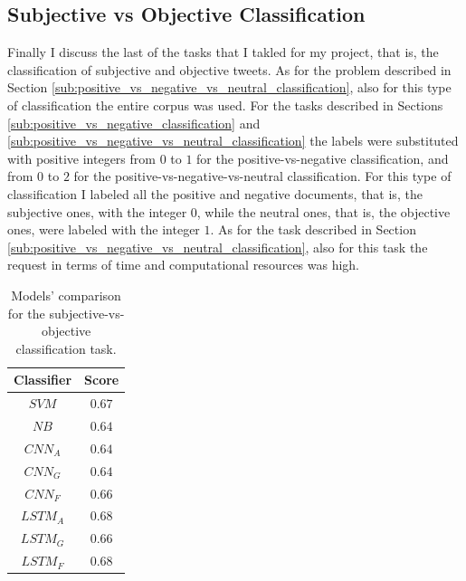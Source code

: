 \documentclass[11pt,twocolumn]{article}
\begin{document}
        \subsection{Subjective vs Objective Classification} %
        \label{sub:subjective_vs_objective_classification}
            Finally I discuss the last of the tasks that I takled for my project, that is, the
            classification of subjective and objective tweets. As for the problem described in Section
            \ref{sub:positive_vs_negative_vs_neutral_classification}, also for this type of
            classification the entire corpus was used. For the tasks described in Sections
            \ref{sub:positive_vs_negative_classification} and
            \ref{sub:positive_vs_negative_vs_neutral_classification} the labels were substituted with
            positive integers from $0$ to $1$ for the positive-vs-negative classification, and from $0$ to
            $2$ for the positive-vs-negative-vs-neutral classification. For this type of classification I
            labeled all the positive and negative documents, that is, the subjective ones, with the integer
            $0$, while the neutral ones, that is, the objective ones, were labeled with the integer $1$.
            As for the task described in Section \ref{sub:positive_vs_negative_vs_neutral_classification},
            also for this task the request in terms of time and computational resources was high.

            \begin{table}[h]
                \centering
                \begin{tabular}{| c | c |}
                    \hline
                    \textbf{Classifier} & \textbf{Score} \\
                    \hline
                    $SVM$ & $0.67$ \\
                    \hline
                    $NB$ & $0.64$ \\
                    \hline
                    $CNN_A$ & $0.64$ \\
                    \hline
                    $CNN_G$ & $0.64$ \\
                    \hline
                    $CNN_F$ & $0.66$ \\
                    \hline
                    $LSTM_A$ & $0.68$ \\
                    \hline
                    $LSTM_G$ & $0.66$ \\
                    \hline
                    $LSTM_F$ & $0.68$ \\
                    \hline
                \end{tabular}
                \caption{Models' comparison for the subjective-vs-objective classification task.}
                \label{tab:so_comparison}
            \end{table}
\end{document}
